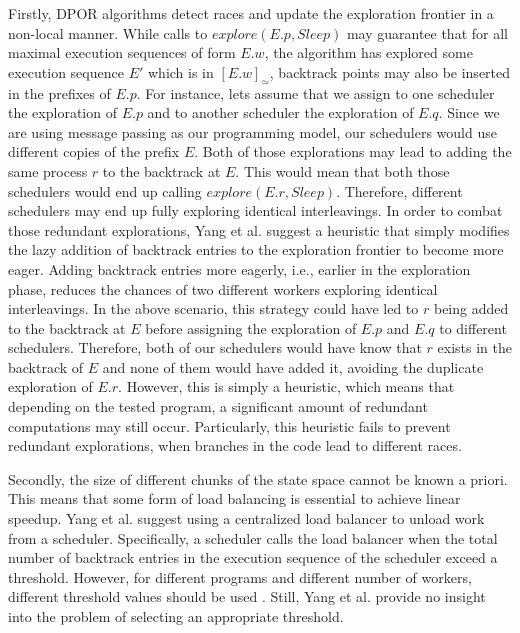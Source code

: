 Firstly, DPOR algorithms detect races and update the exploration frontier in a non-local manner. While calls 
to $explore(E.p, Sleep)$ may guarantee that for all maximal execution 
sequences of form $E.w$, the algorithm has explored some execution sequence $E'$ which is in
$[E.w]_\simeq$, backtrack points may also be inserted in the prefixes of $E.p$. 
For instance, lets assume that we assign to one scheduler the exploration of $E.p$ and to another scheduler
the exploration of $E.q$. Since we are using message passing
as our programming model, our schedulers would use different copies
of the prefix $E$. Both of those explorations may lead to adding the same process $r$ to the backtrack at $E$. This would mean that
both those schedulers would end up calling $explore(E.r, Sleep)$. Therefore, different schedulers may end up fully exploring
identical interleavings. In order to combat those redundant explorations, 
Yang et al. \cite{Yang:2007:DDP:1770532.1770541} suggest a heuristic
that simply modifies the lazy addition of backtrack entries to the exploration frontier \cite{FlanaganDPOR} to become more eager.
Adding backtrack entries more eagerly, i.e., earlier in the exploration phase, reduces the chances of two different workers
exploring identical interleavings. In the above scenario, this strategy could have led to $r$ being added to the backtrack at $E$ before
assigning the exploration of $E.p$ and $E.q$ to different schedulers. Therefore, both of our schedulers would have know that $r$ exists in
the backtrack of $E$ and none of them would have added it,
avoiding the duplicate exploration of $E.r$. However, this is simply a heuristic, which means that
depending on the tested program, a significant amount of redundant computations
may still occur. Particularly, this heuristic fails to prevent redundant explorations, when branches in the code lead to different races.

Secondly, the size of different chunks of the state space cannot be known a priori. This means that some form of load balancing
is essential to achieve linear speedup.
Yang et al. \cite{Yang:2007:DDP:1770532.1770541} suggest using a centralized load balancer to unload work from a scheduler.
Specifically, a scheduler calls the load balancer when the total
number of backtrack entries in the execution sequence of the scheduler
exceed a threshold. However, for different programs and different number of workers, different threshold
values should be used \cite{Simsa2012ScalableDP}. Still, Yang et al. provide no insight into the problem
of selecting an appropriate threshold.

